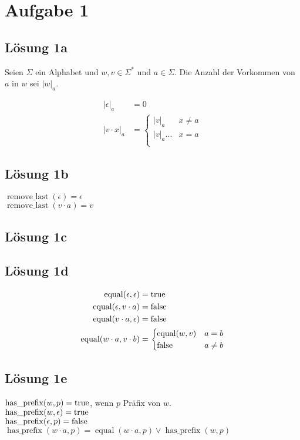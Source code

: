 \documentclass[main.tex]{subfiles}
\begin{document}
\section{Aufgabe 1}

\subsection{Lösung 1a}
Seien $\Sigma$ ein Alphabet und $w,v\in \Sigma^*$ und $a \in \Sigma$. 
Die Anzahl der Vorkommen von $a$ in $w$ sei $|w|_a$.


\begin{align*}
    |\epsilon |_a &= 0 \\
    |v \cdot x|_a &= \begin{cases}
        |v|_a       & x \neq a\\
        |v|_a ...   & x = a\\
    \end{cases}
\end{align*}

\subsection{Lösung 1b}

$\operatorname{remove\_last}(\epsilon) = \epsilon$ \\

$\operatorname{remove\_last}(v \cdot a) = v$


\subsection{Lösung 1c}
\subsection{Lösung 1d}

\begin{align*}
    \operatorname{equal}(\epsilon, \epsilon) &= \text{\rmfamily\upshape true} \\
    \operatorname{equal}(\epsilon, v\cdot a) &= \text{\rmfamily\upshape false} \\
    \operatorname{equal}(v\cdot a, \epsilon) &= \text{\rmfamily\upshape false} \\
    \operatorname{equal}(w\cdot a, v\cdot b) &= \begin{cases}
        \operatorname{equal}(w, v) & a = b\\
        \text{\rmfamily\upshape false} & a \neq b \\
    \end{cases}
\end{align*}



\subsection{Lösung 1e}
$\operatorname{has\_prefix}(w,p) = \text{\rmfamily\upshape true}$, wenn $p$ Präfix von $w$. \\
$\operatorname{has\_prefix}(w,\epsilon) = \text{\rmfamily\upshape true}$ \\
$\operatorname{has\_prefix}(\epsilon, p) = \text{\rmfamily\upshape false}$ \\
$\operatorname{has\_prefix}(w\cdot a, p) = \operatorname{equal}(w\cdot a, p) \vee \operatorname{has\_prefix}(w,p)$
\end{document}
